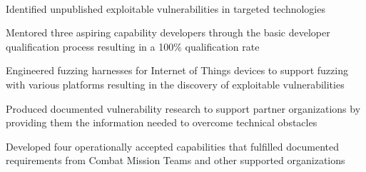 \documentclass[]{resume}
\begin{document}
\begin{minipage}[t]{0.69\textwidth}
 \\
\begin{tightemize}
\item Identified unpublished exploitable vulnerabilities in targeted technologies
\item Mentored three aspiring capability developers through the basic developer qualification process resulting in a 100\% qualification rate
\item Engineered fuzzing harnesses for Internet of Things devices to support fuzzing with various platforms resulting in the discovery of exploitable vulnerabilities
\item Produced documented vulnerability research to support partner organizations by providing them the information needed to overcome technical obstacles
\item Developed four operationally accepted capabilities that fulfilled documented requirements from Combat Mission Teams and other supported organizations

\end{tightemize}

\sectionsep


\end{minipage}
\end{document}
